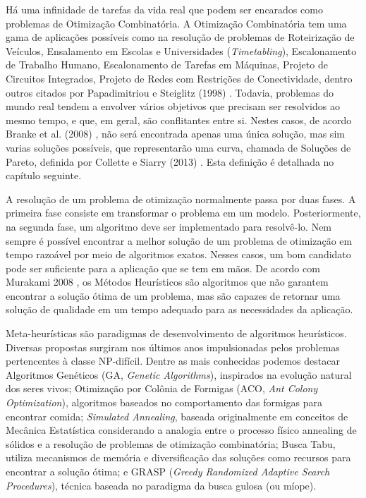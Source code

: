 Há uma infinidade de tarefas da vida real que podem ser encarados como problemas de Otimização Combinatória. A Otimização Combinatória tem uma gama de aplicações possíveis como na resolução de problemas de Roteirização de Veículos, Ensalamento em Escolas e Universidades (\textit{Timetabling}), Escalonamento de Trabalho Humano, Escalonamento de Tarefas em Máquinas, Projeto de Circuitos Integrados, Projeto de Redes com Restrições de Conectividade, dentro outros citados por Papadimitriou e Steiglitz (1998) \cite{papadimitriou1982combinatorial}. Todavia, problemas do mundo real tendem a envolver vários objetivos que precisam ser resolvidos ao mesmo tempo, e que, em geral, são conflitantes entre si. Nestes casos, de acordo Branke et al. (2008) \cite{branke2008multiobjective}, não será encontrada apenas uma única solução, mas sim varias soluções possíveis, que representarão uma curva, chamada de Soluções de Pareto, definida por Collette e Siarry (2013) \cite{collette2013multiobjective}. Esta definição é detalhada no capítulo seguinte. 

A resolução de um problema de otimização normalmente passa por duas fases. A primeira fase consiste em transformar o problema em um modelo. Posteriormente, na segunda fase, um algoritmo deve ser implementado para resolvê-lo. Nem sempre é possível encontrar a melhor solução de um problema de otimização em tempo razoável por meio de algoritmos exatos. Nesses casos, um bom candidato pode ser suficiente para a aplicação que se tem em mãos. De acordo com Murakami 2008 \cite{murakami2008soluccao}, os Métodos Heurísticos são algoritmos que não garantem encontrar a solução ótima de um problema, mas são capazes de retornar uma solução de qualidade em um tempo adequado para as necessidades da aplicação.

Meta-heurísticas são paradigmas de desenvolvimento de algoritmos heurísticos. Diversas propostas surgiram nos últimos anos impulsionadas pelos problemas pertencentes à classe NP-difícil. Dentre as mais conhecidas podemos destacar Algoritmos Genéticos (GA, \textit{Genetic Algorithms}), inspirados na evolução natural dos seres vivos; Otimização por Colônia de Formigas (ACO, \textit{Ant Colony Optimization}), algoritmos baseados no comportamento das formigas para encontrar comida; \textit{Simulated Annealing}, baseada originalmente em conceitos de Mecânica Estatística considerando a analogia entre o processo físico annealing de sólidos e a resolução de problemas de otimização combinatória; Busca Tabu, utiliza mecanismos de memória e diversificação das soluções como recursos para encontrar a solução ótima; e GRASP (\textit{Greedy Randomized Adaptive Search Procedures}), técnica baseada no paradigma da busca gulosa (ou míope).

